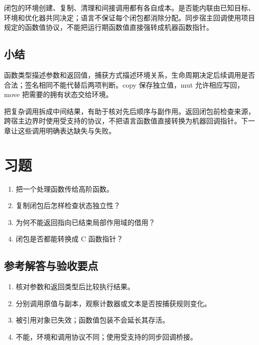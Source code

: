 闭包的环境创建、复制、清理和间接调用都有各自成本。是否能内联由已知目标、环境和优化器共同决定；语言不保证每个闭包都消除分配。同步宿主回调使用项目规定的函数值协议，不能把运行期函数值直接强转成机器函数指针。

\subsection*{小结}

函数类型描述参数和返回值，捕获方式描述环境关系，生命周期决定后续调用是否合法；签名相同不能代替后两项判断。copy 保存独立值，mut 允许相应写回，move 把需要的拥有状态交给环境。

把复杂调用拆成中间结果，有助于核对先后顺序与副作用。返回闭包前检查来源，跨宿主边界时使用受支持的协议，不把语言函数值直接转换为机器回调指针。下一章让这些调用明确表达缺失与失败。

\section{习题}

\begin{enumerate}

\item 把一个处理函数传给高阶函数。

\item 复制闭包后怎样检查状态独立性？

\item 为何不能返回指向已结束局部作用域的借用？

\item 闭包是否都能转换成 C 函数指针？

\end{enumerate}

\subsection*{参考解答与验收要点}

\begin{enumerate}

\item 核对参数和返回类型后比较执行结果。

\item 分别调用原值与副本，观察计数器或文本是否按捕获规则变化。

\item 被引用对象已失效；函数值包装不会延长其存活。

\item 不能，环境和调用协议不同；使用受支持的同步回调桥接。

\end{enumerate}

